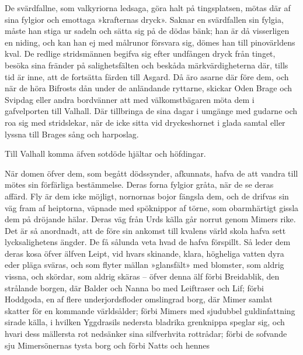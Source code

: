 De svärdfallne, som valkyriorna ledsaga, göra halt på tingsplatsen,
mötas där af sina fylgior och emottaga
»krafternas
dryck». Saknar en svärdfallen sin fylgia, måste han stiga ur sadeln och
sätta sig på de dödas bänk; han är då visserligen en niding, och kan han
ej med målrunor försvara sig, dömes han till pinovärldens kval. De
redlige stridsmännen begifva sig efter undfången dryck från tinget,
besöka sina fränder på salighetsfälten och beskåda märkvärdigheterna
där, tills tid är inne, att de fortsätta färden till Asgard. Då äro
asarne där före dem, och när de höra Bifrosts dån under de anländande
ryttarne, skickar Oden Brage och Svipdag eller andra bordvänner att med
välkomstbägaren möta dem i gafvelporten till Valhall. Där tillbringa de
sina dagar i umgänge med gudarne och roa sig med stridslekar, när de
icke sitta vid dryckeshornet i glada samtal eller lyssna till Brages
sång och harposlag.

Till Valhall komma äfven sotdöde hjältar och höfdingar.

När domen öfver dem, som begått dödssynder, afkunnats, hafva de att
vandra till mötes sin förfärliga bestämmelse. Deras forna fylgior gråta,
när de se deras affärd. Fly är dem icke möjligt, nornornas bojor fängsla
dem, och de drifvas sin väg fram af heiptorna, väpnade med spöknippor af
törne, som obarmhärtigt gissla dem på dröjande hälar. Deras väg från
Urds källa går norrut genom Mimers rike. Det är så anordnadt, att de
före sin ankomst till kvalens värld skola hafva sett lycksalighetens
ängder. De få sålunda veta hvad de hafva förspillt. Så leder dem deras
kosa öfver älfven Leipt, vid hvars skinande, klara, högheliga vatten
dyra eder pläga sväras, och som flyter mällan »glansfält» med blomster,
som aldrig vissna, och skördar, som aldrig skäras -- öfver denna älf
förbi Breidablik, den strålande borgen, där Balder och Nanna bo med
Leiftraser och Lif; förbi Hoddgoda, en af flere underjordsfloder
omslingrad borg, där Mimer samlat skatter för en kommande världsålder;
förbi Mimers med sjudubbel guldinfattning sirade källa, i hvilken
Yggdrasils nedersta bladrika grenknippa speglar sig, och hvari dess
mällersta rot nedsänker sina silfverhvita rottrådar; förbi de sofvande
sju Mimersönernas tysta borg och förbi Natts och hennes

